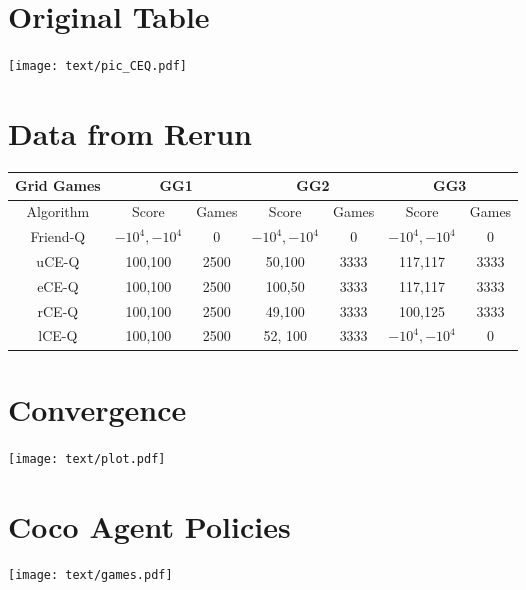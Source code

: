 \section{Original Table}
\texttt{[image: text/pic\_CEQ.pdf]}


\section{Data from Rerun}
\begin{tabular}{||c||c|c||c|c||c|c||}
	\hline
	Grid Games&  \multicolumn{2}{|c||}{GG1} &
	 \multicolumn{2}{|c||}{GG2}  & \multicolumn{2}{|c||}{GG3}  \\ \hline
	Algorithm & Score & Games & Score & Games & Score & Games \\ \hline \hline
	Friend-Q & $-10^{4},-10^{4}$ & 0 & $-10^{4},-10^{4}$ & 0 & $-10^{4},-10^{4}$ & 0 \\ \hline \hline
	uCE-Q & 100,100 & 2500 & 50,100 & 3333 & 117,117 & 3333 \\ \hline
	eCE-Q & 100,100 & 2500 & 100,50 & 3333 & 117,117 & 3333 \\ \hline
	rCE-Q & 100,100 & 2500 & 49,100 & 3333 & 100,125 & 3333 \\ \hline \hline
	lCE-Q & 100,100 & 2500 & 52, 100 & 3333 & $-10^{4},-10^{4}$ & 0 \\ \hline 
	
\end{tabular}

\section{Convergence}
\texttt{[image: text/plot.pdf]}

\section{Coco Agent Policies}
\texttt{[image: text/games.pdf]}

